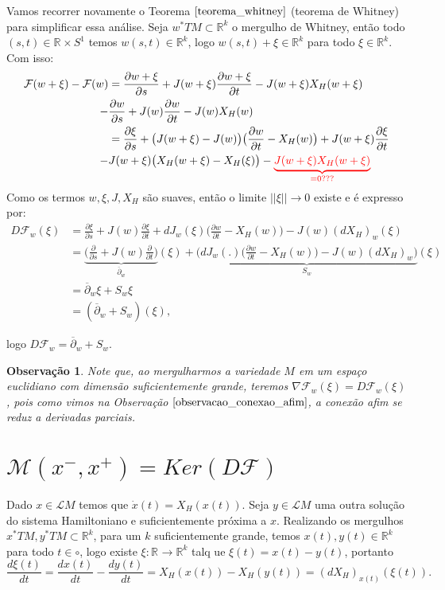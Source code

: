 \documentclass[12pt]{book}
\newtheorem{observacao}[teorema]{Observação}
\newcommand{\bigparenteses}[1]{\big( #1 \big) }
\newcommand{\campohamiltoniano}[1]{X_{H}(#1)}
\newcommand{\circulo}{S^{1}}
\newcommand{\diferencialmapafloer}{D\mapafloer}
\newcommand{\derivada}[2]{\frac{d #1}{d #2}}
\newcommand{\derivadaparcial}[2]{\frac{\partial #1}{\partial #2}}
\newcommand{\diferencialhamiltoniano}[1]{(dX_{H})_{#1}}
\newcommand{\mapafloer}{\mathcal{F}}
\newcommand{\mapafloerdefinicao}[1]{\derivadaparcial{#1}{s} + J(#1)\derivadaparcial{#1}{t} - J(#1)X_{H}(#1)}
\newcommand{\mapafloerparametro}[1]{\mathcal{F}(#1)}
\newcommand{\norma}[1]{||#1||}
\newcommand{\operadorcauchyabrev}[1]{\overline{\partial}_{#1}}
\newcommand{\orbitasconectantespadrao}{\mathcal{M}(x^{-}, x^{+})}
\newcommand{\pullbackfibradotangente}[2]{#1^{*}T#2}
\newcommand{\pullbackfibradotangenteM}[1]{\pullbackfibradotangente{#1}{M}}
\newcommand{\retacartesianocirculo}{\real{} \times \circulo}
\newcommand{\real}[1]{\mathbb{R}^{#1}}
\newcommand{\solucoesperiodicascontrateis}{\mathcal{L}M}
\newcommand{\vermelho}[1]{{\color{red}#1}}
\begin{document}
	Vamos recorrer novamente o Teorema $\ref{teorema_whitney}$ (teorema de Whitney) para simplificar essa análise. Seja $\pullbackfibradotangenteM{w} \subset \real{k}$ o mergulho de Whitney, então todo $(s,t) \in \retacartesianocirculo$ temos $w(s,t) \in \real{k}$, logo  $ w(s,t)+\xi \in \real{k}$ para todo $\xi \in \real{k}$. Com isso:
	$$
	\begin{aligned}
	\mapafloerparametro{w+\xi}-\mapafloerparametro{w}
	&= \mapafloerdefinicao{w+\xi}
	\\
	- & \mapafloerdefinicao{w}
	\\
	&=\derivadaparcial{\xi}{s} + \bigparenteses{J(w+\xi)-J(w)}\bigparenteses{\derivadaparcial{w}{t} - X_{H}(w)} + J(w+\xi)\derivadaparcial{\xi}{t} 
	\\
	- & J(w+\xi)\bigparenteses{X_{H}(w+\xi) - X_{H}(\xi)} - \vermelho{\underbrace{J(w+\xi)X_{H}(w+\xi)}_{=0???}}
	\end{aligned}
	$$
	Como os termos $w, \xi, J, X_{H}$ são suaves, então o limite $\norma{\xi} \to 0$ existe e é expresso por:
	$$
	\begin{aligned}
	D\mapafloer_{w}(\xi) 
	&= \derivadaparcial{\xi}{s} + J(w)\derivadaparcial{\xi}{t}+ dJ_{w}(\xi)\bigparenteses{\derivadaparcial{w}{t} - X_{H}(w)} - J(w) \diferencialhamiltoniano{w}(\xi)
	\\
	&= \underbrace{\Big( \derivadaparcial{}{s} + J(w)\derivadaparcial {}{t}\Big)}_{\overline{\partial}_{w}}(\xi)+ \underbrace{\Big(dJ_{w}(.)\bigparenteses{\derivadaparcial{w}{t} - X_{H}(w)} - J(w) \diferencialhamiltoniano{w}\Big)}_{S_{w}}(\xi)
	\\
	&= \operadorcauchyabrev{w} \xi + S_{w}\xi
	\\
	&= (\operadorcauchyabrev{w}  + S_{w})(\xi),
	\end{aligned}
	$$
	
	logo $ D\mapafloer_{w}= \operadorcauchyabrev{w}  + S_{w}$.
	
	\begin{observacao}
		Note que, ao mergulharmos a variedade $M$ em um espaço euclidiano com dimensão suficientemente grande, teremos $\nabla \mapafloer_{w}(\xi)=D\mapafloer_{w}(\xi)$, pois como vimos na Observação $\ref{observacao_conexao_afim}$, a conexão afim se reduz a derivadas parciais.
	\end{observacao}
	
	\section{$\orbitasconectantespadrao = Ker(\diferencialmapafloer)$}
	Dado $x \in \solucoesperiodicascontrateis$ temos que $\dot{x}(t) = \campohamiltoniano{x(t)}$. Seja $y \in \solucoesperiodicascontrateis$ uma outra solução do sistema Hamiltoniano e suficientemente próxima a $x$. Realizando os mergulhos $\pullbackfibradotangenteM{x}, \pullbackfibradotangenteM{y} \subset \real{k}$, para um $k$ suficientemente grande, temos  $x(t), y(t) \in \real{k}$ para todo $t \in \circ$, logo existe $\xi:\real{}\to \real{k}$ talq ue $\xi(t)=x(t)-y(t)$, portanto
	$$
	\derivada{\xi(t)}{t} = \derivada{x(t)}{t} -\derivada{y(t)}{t} = \campohamiltoniano{x(t)} - \campohamiltoniano{y(t)} =\diferencialhamiltoniano{x(t)}(\xi(t)).
	$$
	
\end{document}
